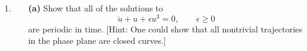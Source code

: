 \documentclass[10pt,letterpaper]{report}
\begin{document}
\begin{enumerate}

\item \begin{qbox}
\begin{itemize}
\vspace{-1.5em}
    \item[\textbf{(a)}]  Show that all of the solutions to
    \[ 
    \ddot u + u + \epsilon u^3 = 0,\qquad \epsilon \geq 0
    \]
    are periodic in time. [Hint: One could show that all nontrivial trajectories in the phase plane are closed curves.]
    

\end{itemize}
\end{qbox}
\end{enumerate}
\end{document}
